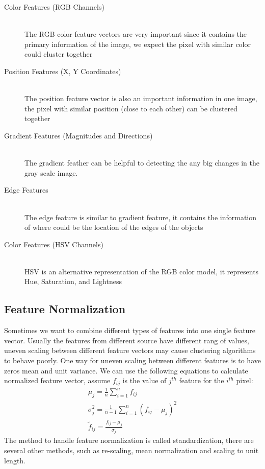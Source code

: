 \documentclass[12pt]{article}
\begin{document}
\begin{description}
	\item [Color Features (RGB Channels)] \hfill \\ The RGB color feature vectors are very important since it contains the primary information of the image, we expect the pixel with similar color could cluster together
	\item [Position Features (X, Y Coordinates)] \hfill \\The position feature vector is also an important information in one image, the pixel with similar position (close to each other) can be clustered together
	\item [Gradient Features (Magnitudes and Directions)] \hfill \\ The gradient feather can  be helpful to detecting the any big changes in the gray scale image.
	\item [Edge Features] \hfill \\ The edge feature is similar to gradient feature, it contains the information of where could be the location of the edges of the objects
	\item [Color Features (HSV Channels)] \hfill \\ HSV is an alternative representation of the RGB color model, it represents Hue, Saturation, and Lightness 
\end{description}


\subsection{Feature Normalization}
Sometimes we want to combine different types of features into one single feature vector. Usually the features from different source have different rang of values, uneven scaling between different feature vectors may cause clustering algorithms to behave poorly.
\noindent
One way for uneven scaling between different features is to have zeros mean and unit variance. We can use the following equations to calculate normalized feature vector, assume $f_{ij}$ is the value of $j^{th}$ feature for the $i^{th}$ pixel:
\begin{gather}
\mu _j = \frac{1}{n} \sum_{i=1}^{n}f_{ij} \\
\sigma_{j}^{2} = \frac{1}{n-1}\sum_{i=1}^{n}(f_{ij}-\mu_j)^2 \\
\tilde{f}_{ij} = \frac{f_{ij}-\mu_j}{\sigma _j}
\end{gather}
\noindent
The method to handle feature normalization is called standardization, there are several other methods, such as re-scaling, mean normalization and scaling to unit length.
\end{document}
